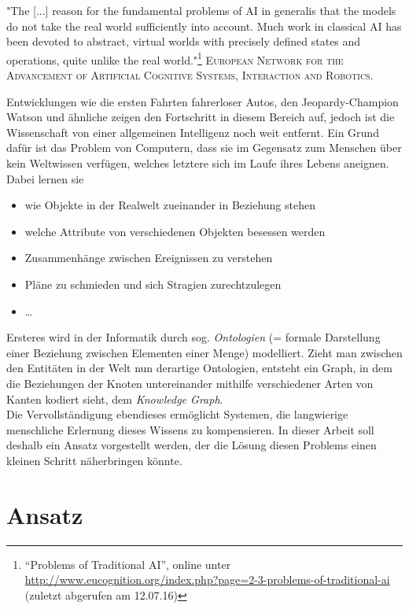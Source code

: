 \newpage
\begin{itquote}
"The [...] reason for the fundamental problems of AI in generalis that the models do
 not take the real world sufficiently into account. Much work in classical AI has been devoted to abstract, virtual
 worlds with precisely defined states and operations, quite unlike the real world."\footnote{``Problems of Traditional AI'',
 online unter \url{http://www.eucognition.org/index.php?page=2-3-problems-of-traditional-ai} (zuletzt abgerufen am 12.07.16)}
 \flushright
 \textsc{European Network for the Advancement of Artificial Cognitive Systems, Interaction
 and Robotics.}
\end{itquote}

Entwicklungen wie die ersten Fahrten fahrerloser Autos, den Jeopardy-Champion Watson und ähnliche zeigen den Fortschritt in diesem Bereich auf,
jedoch ist die Wissenschaft von einer allgemeinen Intelligenz noch weit entfernt. Ein Grund dafür ist das Problem von Computern,
dass sie im Gegensatz zum Menschen über kein Weltwissen verfügen, welches letztere sich im Laufe ihres Lebens aneignen.
Dabei lernen sie
\begin{itemize}
  \item wie Objekte in der Realwelt zueinander in Beziehung stehen
  \item welche Attribute von verschiedenen Objekten besessen werden
  \item Zusammenhänge zwischen Ereignissen zu verstehen
  \item Pläne zu schmieden und sich Stragien zurechtzulegen
  \item \ldots
\end{itemize}

Ersteres wird in der Informatik durch sog. \emph{Ontologien} (= formale Darstellung einer Beziehung zwischen Elementen einer Menge)
modelliert. Zieht man zwischen den Entitäten in der Welt nun derartige Ontologien, entsteht ein Graph, in dem die Beziehungen
der Knoten untereinander mithilfe verschiedener Arten von Kanten kodiert sieht, dem \emph{Knowledge Graph}.\\
Die Vervollständigung ebendieses ermöglicht Systemen, die langwierige menschliche Erlernung dieses Wissens zu kompensieren.
In dieser Arbeit soll deshalb ein Ansatz vorgestellt werden, der die Lösung diesen Problems einen kleinen Schritt näherbringen könnte.

\section{Ansatz}

